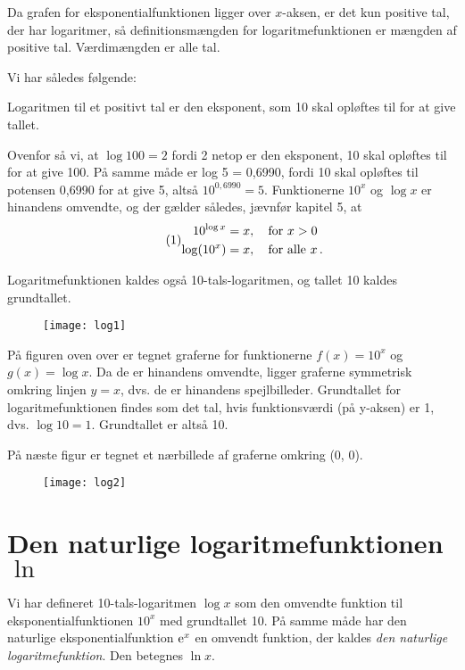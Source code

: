\documentclass[12pt,oneside,a4paper]{article}
\theoremstyle{plain}
\begin{document}
Da grafen for eksponentialfunktionen ligger over $x$-aksen, er det kun positive
tal, der har logaritmer, så definitionsmængden for logaritmefunktionen er
mængden af positive tal. Værdimængden er alle tal.

Vi har således følgende:
\begin{tcolorbox}
Logaritmen til et positivt tal er den eksponent, som 10 skal opløftes til for
at give tallet.
\end{tcolorbox}

Ovenfor så vi, at $\log 100 = 2$ fordi 2 netop er den eksponent, 10 skal
opløftes til for at give 100. På samme måde er log 5 = 0,6990, fordi 10 skal
opløftes til potensen 0,6990 for at give 5, altså $10^{0,6990} = 5$.
Funktionerne $10^x$ og $\log x$ er hinandens omvendte, og der gælder således,
jævnfør kapitel 5, at
\[
    \tag{1}
    \begin{aligned}
        10^{\log x } &= x,\quad \text{for $x > 0$} \\
        \log (10^x) &= x,\quad \text{for alle $x$\,.}
    \end{aligned}
\]

Logaritmefunktionen kaldes også 10-tals-logaritmen, og tallet 10 kaldes grundtallet.

\begin{figure}[H]
    \centering
    \texttt{[image: log1]}
    \caption{}
    \label{fig1}
\end{figure}

På figuren oven over er tegnet graferne for funktionerne $f(x) = 10^x$ og $g(x)
= \log x$. Da de er hinandens omvendte, ligger graferne symmetrisk omkring
linjen $y = x$, dvs.  de er hinandens spejlbilleder. Grundtallet for
logaritmefunktionen findes som det tal, hvis funktionsværdi (på y-aksen) er 1,
dvs. $\log 10 = 1$. Grundtallet er altså 10.

På næste figur er tegnet et nærbillede af graferne omkring (0, 0).
\begin{figure}[H]
    \centering
    \texttt{[image: log2]}
    \caption{}
    \label{fig2}
\end{figure}


\section*{Den naturlige logaritmefunktionen $\ln$}
Vi har defineret 10-tals-logaritmen $\log x$ som den omvendte funktion til
eksponentialfunktionen $10^x$ med grundtallet 10. På samme måde har den
naturlige eksponentialfunktion ${\rm e}^x$ en omvendt funktion, der kaldes
{\em den naturlige logaritmefunktion}. Den betegnes $\ln x$.
\end{document}
